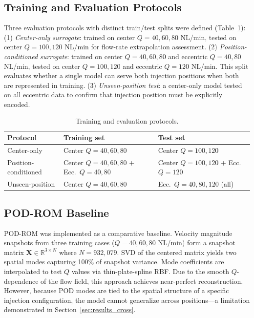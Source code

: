 \documentclass[12pt,a4paper]{article}
\begin{document}
\subsection{Training and Evaluation Protocols}
Three evaluation protocols with distinct train/test splits were defined (Table~\ref{tab:split}): (1) \textit{Center-only surrogate}: trained on center $Q=40,60,80$ NL/min, tested on center $Q=100,120$ NL/min for flow-rate extrapolation assessment. (2) \textit{Position-conditioned surrogate}: trained on center $Q=40,60,80$ and eccentric $Q=40,80$ NL/min, tested on center $Q=100,120$ and eccentric $Q=120$ NL/min. This split evaluates whether a single model can serve both injection positions when both are represented in training. (3) \textit{Unseen-position test}: a center-only model tested on all eccentric data to confirm that injection position must be explicitly encoded.

\begin{table}[h]
\centering
\caption{Training and evaluation protocols.}
\label{tab:split}
\small
\begin{tabular}{lll}
\toprule Protocol & Training set & Test set \\ \midrule
Center-only & Center $Q=40,60,80$ & Center $Q=100,120$ \\
Position-conditioned & Center $Q=40,60,80$ + Ecc.\ $Q=40,80$ & Center $Q=100,120$ + Ecc.\ $Q=120$ \\
Unseen-position & Center $Q=40,60,80$ & Ecc.\ $Q=40,80,120$ (all) \\
\bottomrule
\end{tabular}
\end{table}

\subsection{POD-ROM Baseline}
POD-ROM was implemented as a comparative baseline. Velocity magnitude snapshots from three training cases ($Q=40,60,80$ NL/min) form a snapshot matrix $\mathbf{X}\in\mathbb{R}^{3\times N}$ where $N=932{,}079$. SVD of the centered matrix yields two spatial modes capturing 100\% of snapshot variance. Mode coefficients are interpolated to test $Q$ values via thin-plate-spline RBF. Due to the smooth $Q$-dependence of the flow field, this approach achieves near-perfect reconstruction. However, because POD modes are tied to the spatial structure of a specific injection configuration, the model cannot generalize across positions---a limitation demonstrated in Section~\ref{sec:results_cross}.
\end{document}
